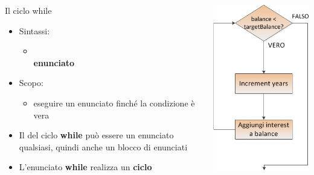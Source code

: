 \begin{frame}
\begin{columns}
\begin{column}{0.5\textwidth}
\begin{block}{Il ciclo while}
\begin{itemize}
\item Sintassi:
\begin{itemize}
\item \textbf{}\\
\hspace{0.5cm}\textbf{\alert{enunciato}}
\end{itemize}
\item Scopo:
\begin{itemize}
\item eseguire un enunciato finché la condizione è vera
\end{itemize}
\item Il \textbf{} del ciclo \textbf{while} può essere un enunciato qualsiasi, quindi anche un blocco di enunciati
\item L'enunciato \textbf{while} realizza un \textbf{\alert{ciclo}}
\end{itemize}
\end{block}
\end{column}
\begin{column}{.5\textwidth}
\centering
\includegraphics[scale=0.6]{images/CicloWhile.jpg}
\end{column}
\end{columns}
\end{frame}

